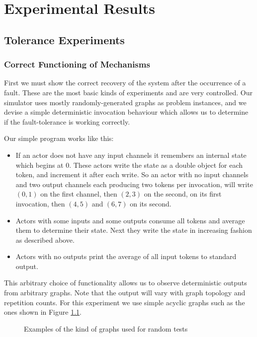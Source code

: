 \chapter{Experimental Results}
\label{chapExperiment}

\section{Tolerance Experiments}

\subsection{Correct Functioning of Mechanisms}

First we must show the correct recovery of the system after the occurrence of a fault.
These are the most basic kinds of experiments and are very controlled.
Our simulator uses mostly randomly-generated graphs as problem instances, and we devise a simple deterministic invocation behaviour which allows us to determine if the fault-tolerance is working correctly.

Our simple program works like this:
\begin{itemize}
	\item If an actor does not have any input channels it remembers an internal state which begins at 0.
			These actors write the state as a double object for each token, and increment it after each write.
			So an actor with no input channels and two output channels each producing two tokens per invocation, will write $(0,1)$ on the first channel, then $(2,3)$ on the second, on its first invocation, then $(4, 5)$ and $(6, 7)$ on its second.
	\item Actors with some inputs and some outputs consume all tokens and average them to determine their state.
			Next they write the state in increasing fashion as described above.
	\item Actors with no outputs print the average of all input tokens to standard output.
\end{itemize}
\noindent This arbitrary choice of functionality allows us to observe deterministic outputs from arbitrary graphs.
Note that the output will vary with graph topology and repetition counts.
For this experiment we use simple acyclic graphs such as the ones shown in Figure \ref{figRGraph}.

\begin{figure}
\begin{center}
	
\caption{Examples of the kind of graphs used for random tests}
\label{figRGraph}
\end{center}
\end{figure}

